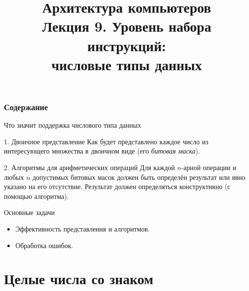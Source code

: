 \newcommand{\h}{%
handout,%
}



\usepackage{wasysym}
\usepackage{marvosym}

\title[Числовые типы данных]{Архитектура компьютеров\texorpdfstring{\\}{ }Лекция 9. Уровень набора инструкций:\texorpdfstring{\\}{}числовые типы данных}


\newcommand{\LRA}{\ensuremath{\leftrightarrow}}


\begin{frame}
\titlepage
\end{frame}

\begin{frame}
\frametitle{Содержание}
\tableofcontents[hideallsubsections]
\end{frame}

\begin{frame}{Что значит поддержка числового типа данных}

\pause
\begin{block}{1. Двоичное представление}
    Как будет представлено каждое число из интересующего множества
    в двоичном виде (его \emph{битовая маска}).
\end{block}

\pause
\begin{block}{2. Алгоритмы для арифметических операций}
Для каждой $n$-арной операции и любых $n$ допустимых битовых масок
должен быть определён результат или явно указано на его отсутствие.
Результат должен определяться конструктивно (с помощью алгоритма).
\end{block}

\pause
\begin{block}{Основные задачи}
\pause
\begin{itemize}[<+->]
    \item Эффективность представления и алгоритмов.
    \item Обработка ошибок.
\end{itemize}
\end{block}

\end{frame}

\section{Целые числа со знаком}

